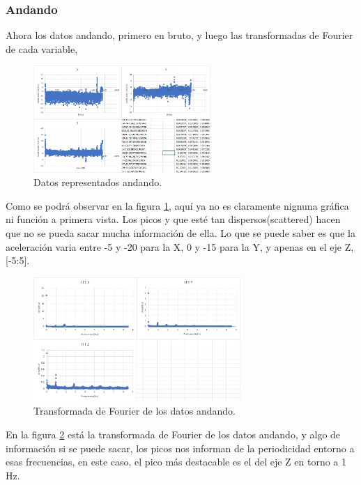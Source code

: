 \documentclass[12pt]{article}
\numberwithin{equation}{section}
\begin{document}
\subsubsection{Andando}

Ahora los datos andando, primero en bruto, y luego las transformadas de Fourier de cada variable,
\begin{figure}[h]
    \centering
    \includegraphics[width=0.6\textwidth]{andandoraw.png}
    \caption{Datos representados andando.}
    \label{fig:andandoraw}
\end{figure}

Como se podrá observar en la figura \ref{fig:andandoraw}, aquí ya no es claramente nignuna gráfica ni función a primera vista. Los picos y que esté tan dispersos(scattered) hacen que no se pueda sacar mucha información de ella. Lo que se puede saber es que la aceleración varia entre -5 y -20 para la X, 0 y -15 para la Y, y apenas en el eje Z, [-5:5].

\begin{figure}[h]
    \centering
    \includegraphics[width=0.7\textwidth]{andandofft.png}
    \caption{Transformada de Fourier de los datos andando.}
    \label{fig:andandofft}
\end{figure}

En la figura \ref{fig:andandofft} está la transformada de Fourier de los datos andando, y algo de información si se puede sacar, los picos nos informan de la periodicidad entorno a esas frecuencias, en este caso, el pico más destacable es el del eje Z en torno a 1 Hz.
\end{document}
